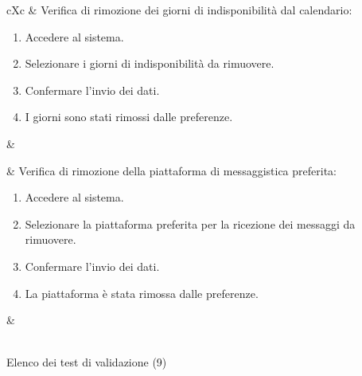 \begin{table}[H]
\begin{VTtable}[1.7]{\textwidth}{cXc}
        \addtotv & Verifica di rimozione dei giorni di indisponibilità dal calendario:
		\begin{enumerate}
			\item Accedere al sistema.
            \item Selezionare i giorni di indisponibilità da rimuovere.
            \item Confermare l'invio dei dati.
            \item I giorni sono stati rimossi dalle preferenze.
		\end{enumerate}
		& \TNI \\\midrule
        
        \addtotv & Verifica di rimozione della piattaforma di messaggistica preferita:
		\begin{enumerate}
			\item Accedere al sistema.
            \item Selezionare la piattaforma preferita per la ricezione dei messaggi da rimuovere.
            \item Confermare l'invio dei dati.
            \item La piattaforma è stata rimossa dalle preferenze.
		\end{enumerate}
		& \TNI \\
        \bottomrule\\
        \end{VTtable}
	\caption{Elenco dei test di validazione (9)}
\end{table}

